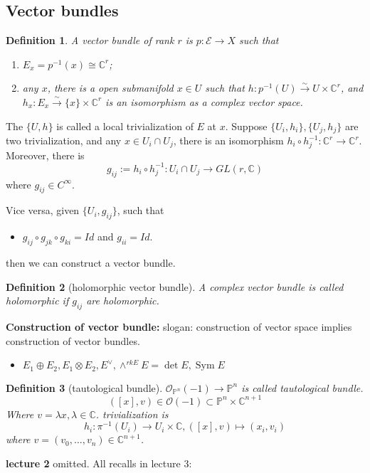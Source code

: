 \documentclass{article}
\newtheorem{definition}{Definition}[subsection]
\begin{document}
\subsection{Vector bundles}
\begin{definition}
  A vector bundle of rank $r$ is $p:\mathscr{E} \to X$ such that
  \begin{enumerate}
    \item $E_{x}=p^{-1}(x)\cong \mathbb{C}^{r}$;
    \item any $x$, there is a open submanifold $x\in U$ such that $h:p^{-1}(U)\xrightarrow{\sim} U \times \mathbb{C}^{r}$, and $h_{x}:E_{x}\xrightarrow{\sim} \{x\} \times \mathbb{C}^{r} $ is an isomorphism as a complex vector space.
  \end{enumerate}
\end{definition}
  The $\{U,h\} $ is called a local trivialization of $E$ at $x$. Suppose $\{U_{i},h_{i}\},\{U_{j},h_{j}\}  $ are two trivialization, and any $x\in U_{i} \cap U_{j}$, there is an isomorphism $h_{i}\circ h_{j}^{-1}: \mathbb{C}^{r}\to \mathbb{C}^{r}$. Moreover, there is
  \[
    g_{ij}:=h_{i}\circ h_{j}^{-1}: U_{i} \cap U_{j}\to GL(r,\mathbb{C})
  \]
  where $g_{ij}\in C^{\infty}$.

  Vice versa, given $\{U_{i},g_{ij}\}$, such that
\begin{itemize}
  \item $g_{ij}\circ g_{jk} \circ g_{ki}=Id$ and $g_{ii}=Id$.
\end{itemize}
  then we can construct a vector bundle.
\begin{definition}[holomorphic vector bundle]
A complex vector bundle is called holomorphic if $g_{ij}$ are holomorphic.
\end{definition}
\textbf{Construction of vector bundle:}
slogan: construction of vector space implies construction of vector bundles.
\begin{itemize}
  \item $E_{1} \oplus E_{2}, E_{1} \otimes E_2, E^{\vee},\wedge^{rk E}E= \det E, \operatorname{Sym}E$
\end{itemize}
\begin{definition}[tautological bundle]
  $\mathcal{O}_{\mathbb{P}^{n}}(-1) \to \mathbb{P}^{n}$ is called tautological bundle.
  \[
    ([x],v) \in \mathcal{O}(-1) \subset \mathbb{P}^{n} \times \mathbb{C}^{n+1}
  \]
 Where $v=\lambda x,\lambda \in \mathbb{C}$. trivialization is
 \[
  h_{i}:\pi^{-1}(U_{i})\to U_{i}\times \mathbb{C},([x],v)\mapsto (x_{i},v_{i})
 \]
 where $v=(v_{0},\ldots ,v_{n})\in \mathbb{C}^{n+1}$.
\end{definition}
\textbf{lecture 2}
omitted. All recalls in lecture 3:
\end{document}
